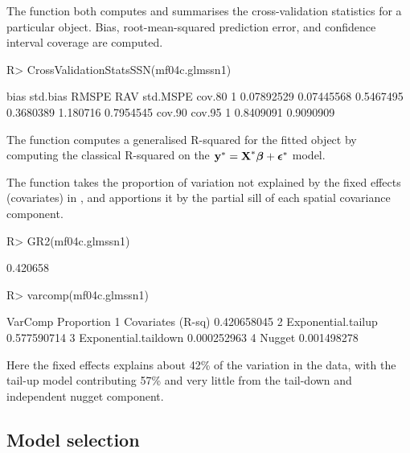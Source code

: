 \documentclass[nojss]{jss}
\renewenvironment{Schunk}{\vspace{\topsep}}{\vspace{\topsep}}
\def\bbeta{\mbox{\boldmath $\beta$}}
\def\bepsilon{\mbox{\boldmath $\epsilon$}}
\def\by{\textbf{y}}
\def\bX{\textbf{X}}
\begin{document}
The function  both computes and
summarises the cross-validation statistics for a particular
 object. Bias, root-mean-squared prediction error, and
confidence interval coverage are computed.

\begin{Schunk}
\begin{Sinput}
R> CrossValidationStatsSSN(mf04c.glmssn1)
\end{Sinput}
\begin{Soutput}
        bias   std.bias     RMSPE       RAV std.MSPE    cov.80
1 0.07892529 0.07445568 0.5467495 0.3680389 1.180716 0.7954545
     cov.90    cov.95
1 0.8409091 0.9090909
\end{Soutput}
\end{Schunk}

The  function computes a generalised R-squared for the
fitted  object by computing the classical R-squared on
the $\by^* = \bX^*\bbeta + \bepsilon^*$ model.

The  function takes the proportion of variation not
explained by the fixed effects (covariates) in , and
apportions it by the partial sill of each spatial covariance
component.

\begin{Schunk}
\begin{Sinput}
R> GR2(mf04c.glmssn1)
\end{Sinput}
\begin{Soutput}
         [,1]
[1,] 0.420658
\end{Soutput}
\begin{Sinput}
R> varcomp(mf04c.glmssn1)
\end{Sinput}
\begin{Soutput}
               VarComp  Proportion
1    Covariates (R-sq) 0.420658045
2   Exponential.tailup 0.577590714
3 Exponential.taildown 0.000252963
4               Nugget 0.001498278
\end{Soutput}
\end{Schunk}

Here the fixed effects explains about 42\% of the variation in the
data, with the tail-up model contributing 57\% and very little from the tail-down and independent nugget
component.


\subsection{Model selection}
\end{document}
